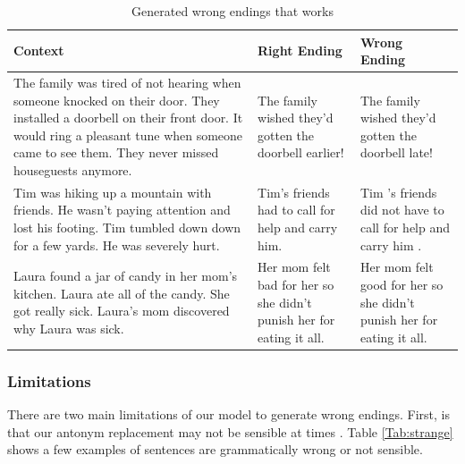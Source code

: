 \documentclass{article}
\begin{document}
\begin{table}[h]\footnotesize
  \centering

  \begin{tabular}{ p{6cm} p{3cm} p{3cm} }
    \toprule
    Context & Right Ending & Wrong Ending \\
    \midrule
    The family was tired of not hearing when someone knocked on their door. They installed a doorbell on their front door. It would ring a pleasant tune when someone came to see them. They never missed houseguests anymore.  & The family wished they'd gotten the doorbell earlier! & The family wished they'd gotten the doorbell late! \\
    \hline
    Tim was hiking up a mountain with friends. He wasn't paying attention and lost his footing. Tim tumbled down down for a few yards. He was severely hurt. & Tim's friends had to call for help and carry him. & Tim 's friends did not have to call for help and carry him . \\
    \hline
    Laura found a jar of candy in her mom's kitchen. Laura ate all of the candy. She got really sick. Laura's mom discovered why Laura was sick. & Her mom felt bad for her so she didn't punish her for eating it all. & Her mom felt good for her so she didn't punish her for eating it all.\\
    \bottomrule
  \end{tabular}
  \label{Tab:works}
  \caption{Generated wrong endings that works}
\end{table}

\subsubsection{Limitations}
There are two main limitations of our model to generate wrong endings. First, is that our antonym replacement may not be sensible at times \citep{wordnet}. Table \ref{Tab:strange} shows a few examples of sentences are grammatically wrong or not sensible.
\end{document}

